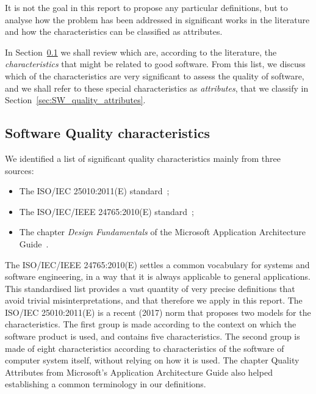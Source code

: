 It is not the goal in this report to propose any particular definitions, but to analyse how the problem has been addressed in significant works in the literature and how the characteristics can be classified as attributes.

In Section~\ref{subsect_sqchar} we shall review which are, according to the literature, the \textit{characteristics} that might be related to good software. From this list, we discuss which of the characteristics are very significant to assess the quality of software, and we shall refer to these special characteristics as \textit{attributes}, that we classify in Section~\ref{sec:SW_quality_attributes}.

\subsection{Software Quality characteristics}
\label{subsect_sqchar}
We identified a list of significant quality characteristics mainly from three sources:
\begin{itemize}
    \item The ISO/IEC 25010:2011(E) standard~\cite{iso_25010_2011_2017};
    \item The ISO/IEC/IEEE 24765:2010(E) standard~\cite{iso_central_secretary_isoiecieee_2010};
    \item The chapter \textit{Design Fundamentals} of the Microsoft Application Architecture Guide~\cite{microsoft_2010}.
\end{itemize}

The ISO/IEC/IEEE 24765:2010(E) settles a common vocabulary for systems and software engineering, in a way that it is always applicable to general applications. This standardised list provides a vast quantity of very precise definitions that avoid trivial misinterpretations, and that therefore we apply in this report. 
%
The ISO/IEC 25010:2011(E) is a recent (2017) norm that proposes two models for the characteristics. The first group is made according to the context on which the software product is used, and contains five characteristics. The second group is made of eight characteristics according to characteristics of the software of computer system itself, without relying on how it is used.
%
The chapter Quality Attributes from Microsoft's Application Architecture Guide also helped establishing a common terminology in our definitions.

